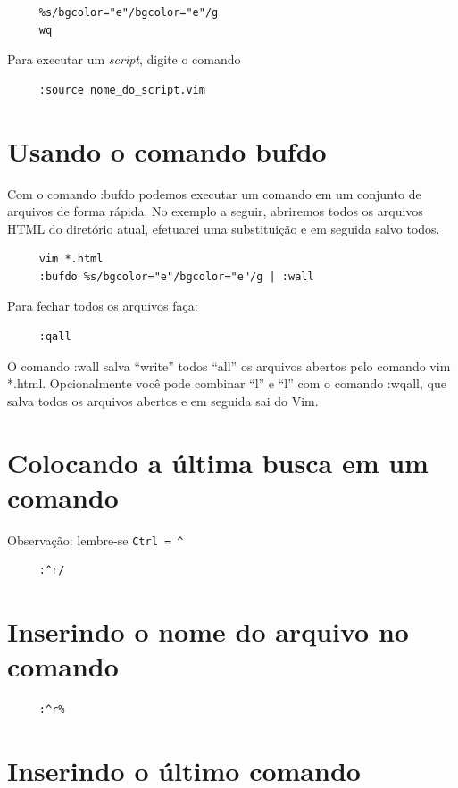 \documentclass[10pt,a4paper,openany]{book}
\begin{document}
\begin{verbatim}
     %s/bgcolor="e"/bgcolor="e"/g
     wq
\end{verbatim}

Para executar um {\em script}, digite o comando

\begin{verbatim}
     :source nome_do_script.vim
\end{verbatim}

\section{Usando o comando bufdo}\label{Usando o comando bufdo}

Com o comando :bufdo podemos executar um comando em um
conjunto de arquivos de forma rápida. No exemplo a seguir, abriremos
todos os arquivos HTML do diretório atual, efetuarei uma substituição
e em seguida salvo todos.

\begin{verbatim}
     vim *.html
     :bufdo %s/bgcolor="e"/bgcolor="e"/g | :wall
\end{verbatim}

Para fechar todos os arquivos faça:

\begin{verbatim}
     :qall
\end{verbatim}

O comando :wall salva ``write'' todos ``all'' os arquivos
abertos pelo comando vim *.html. Opcionalmente você pode
combinar ``l'' e ``l'' com o comando :wqall, que
salva todos os arquivos abertos e em seguida sai do Vim.

\section{Colocando a última busca em um comando }
Observação: lembre-se \verb|Ctrl = ^|

\begin{verbatim}
     :^r/
\end{verbatim}

\section{Inserindo o nome do arquivo no comando }

\begin{verbatim}
     :^r%
\end{verbatim}

\section{Inserindo o último comando }
\end{document}
